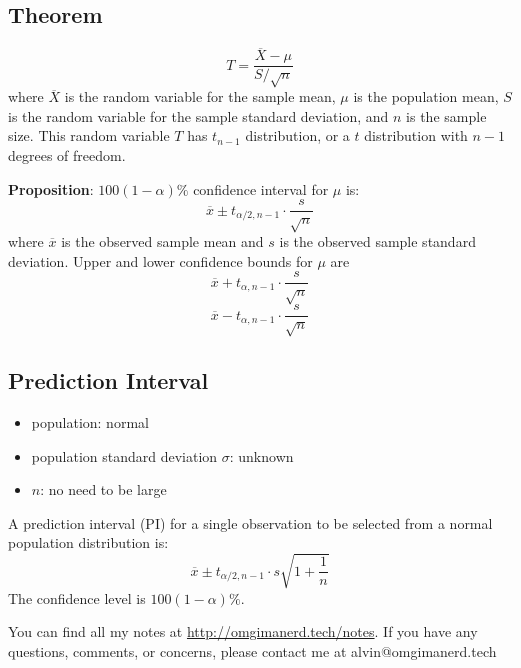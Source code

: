 \documentclass{math}
\begin{document}
\subsection*{Theorem}
\[ T = \frac{\overline{X}-\mu}{S/\sqrt{n}} \]
where \( \overline{X} \) is the random variable for the sample mean, \( \mu \)
is the population mean, \( S \) is the random variable for the sample standard
deviation, and \( n \) is the sample size. This random variable \( T \) has
\( t_{n-1} \) distribution, or a \( t \) distribution with \( n-1 \) degrees of
freedom. \par
\textbf{Proposition}: \( 100(1-\alpha)\% \) confidence interval for \( \mu \)
is:
\[ \overline{x}\pm t_{\alpha/2,n-1}\cdot\frac{s}{\sqrt{n}} \]
where \( \overline{x} \) is the observed sample mean and \( s \) is the observed
sample standard deviation. Upper and lower confidence bounds for \( \mu \) are
\[ \overline{x}+t_{\alpha,n-1}\cdot\frac{s}{\sqrt{n}} \]
\[ \overline{x}-t_{\alpha,n-1}\cdot\frac{s}{\sqrt{n}} \]

\subsection*{Prediction Interval}
\begin{itemize}
  \item population: normal
  \item population standard deviation \( \sigma \): unknown
  \item \( n \): no need to be large
\end{itemize}
A prediction interval (PI) for a single observation to be selected from a normal
population distribution is:
\[ \overline{x}\pm t_{\alpha/2,n-1}\cdot s\sqrt{1+\frac{1}{n}} \]
The confidence level is \( 100(1-\alpha)\% \).

\begin{center}
  You can find all my notes at \url{http://omgimanerd.tech/notes}. If you have
  any questions, comments, or concerns, please contact me at
  alvin@omgimanerd.tech
\end{center}
\end{document}
